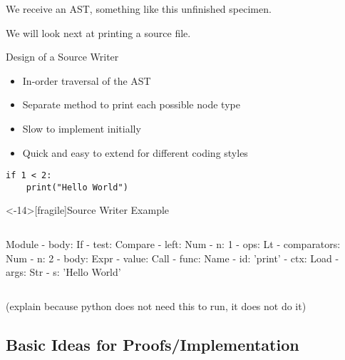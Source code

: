 We receive an AST, something like this unfinished specimen.


We will look next at printing a source file.

\begin{frame}[fragile]{Design of a Source Writer}
\begin{itemize}
\item In-order traversal of the AST
\item Separate method to print each possible node type
\item Slow to implement initially
\item Quick and easy to extend for different coding styles
\end{itemize}

\begin{lstlisting}
if 1 < 2:
    print("Hello World")
\end{lstlisting}
\end{frame}

\begin{frame}<-14>[fragile]{Source Writer Example}
\begin{columns}[b]
{\small
\begin{semiverbatim}
\alert<2-13>{Module}
\alert<2-13>{  - body: If}
\alert<3-5>{    - test: Compare}
\alert<3>{      - left: Num}
\alert<3>{        - n: 1}
\alert<4>{      - ops: Lt}
\alert<5>{      - comparators: Num}
\alert<5>{        - n: 2}
\alert<7-13>{    - body: Expr}
\alert<7-13>{      - value: Call}
\alert<7-8>{        - func: Name}
\alert<7>{          - id: 'print'}
\alert<8>{          - ctx: Load}
\alert<10-12>{        - args: Str}
\alert<11>{          - s: 'Hello World'}
\end{semiverbatim}}
\begin{semiverbatim}
\textbf{
  
\quad\quad{}\uncover<10->{"}
}
\end{semiverbatim}
\end{columns}
\end{frame}


(explain because python does not need this to run, it does not do it)
\subsection{Basic Ideas for Proofs/Implementation}

